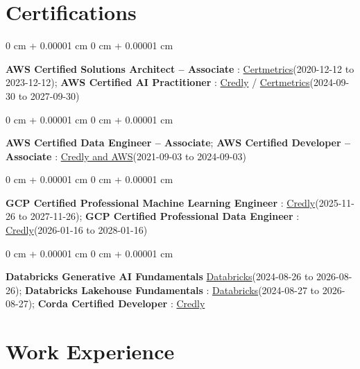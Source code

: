 \documentclass[10pt, letterpaper]{article}
\newenvironment{onecolentry}{
    \begin{adjustwidth}{
        0 cm + 0.00001 cm
    }{
        0 cm + 0.00001 cm
    }
}{
    \end{adjustwidth}
} %
\begin{document}
    \vspace{2 pt }
    \section{Certifications}
        \vspace{2 pt }
        \begin{samepage}
            \begin{onecolentry}
                \textbf{AWS Certified Solutions Architect – Associate} : \href{https://cp.certmetrics.com/amazon/en/public/verify/credential/SNBY48EBJJVE1SWX}{Certmetrics}(2020-12-12 to 2023-12-12); \textbf{AWS Certified AI Practitioner} : \href{https://www.credly.com/badges/451b7ba5-8be1-4a8e-bbec-ade26627a6b6/public_url}{Credly} / \href{https://cp.certmetrics.com/amazon/en/public/verify/credential/495f0d9853874bf9a33c17f8e89ce131}{Certmetrics}(2024-09-30 to 2027-09-30)
            \end{onecolentry}
            \begin{onecolentry}
                \textbf{AWS Certified Data Engineer – Associate}; \textbf{AWS Certified Developer – Associate} : \href{https://www.credly.com/badges/b8106fbd-d3d1-4204-8cdf-e708798fd582/public_url}{Credly and AWS}(2021-09-03 to 2024-09-03)
            \end{onecolentry}
            \begin{onecolentry}
                \textbf{GCP Certified Professional Machine Learning Engineer} : \href{https://www.credly.com/badges/a6965347-09ea-4d8f-b398-0e151407160d/public_url}{Credly}(2025-11-26 to 2027-11-26); \textbf{GCP Certified Professional Data Engineer} : \href{https://www.credly.com/badges/977e96d9-12e7-4f6c-b8a7-df71fb7153b8/public_url}{Credly}(2026-01-16 to 2028-01-16)
            \end{onecolentry}
            \begin{onecolentry}
                \textbf{Databricks Generative AI Fundamentals} \href{https://sgq.io/3uIFGNi}{Databricks}(2024-08-26 to 2026-08-26); \textbf{Databricks Lakehouse Fundamentals} : \href{https://scl.io/FXGKS0u}{Databricks}(2024-08-27 to 2026-08-27); \textbf{Corda Certified Developer} : \href{https://www.credly.com/badges/7f29d39c-34b6-4de9-b07d-e10f1090a335/linked_in_profile}{Credly}
            \end{onecolentry}
        \end{samepage}


    \vspace{2 pt }
    \section{Work Experience}
        \vspace{0.1cm}
\end{document}
